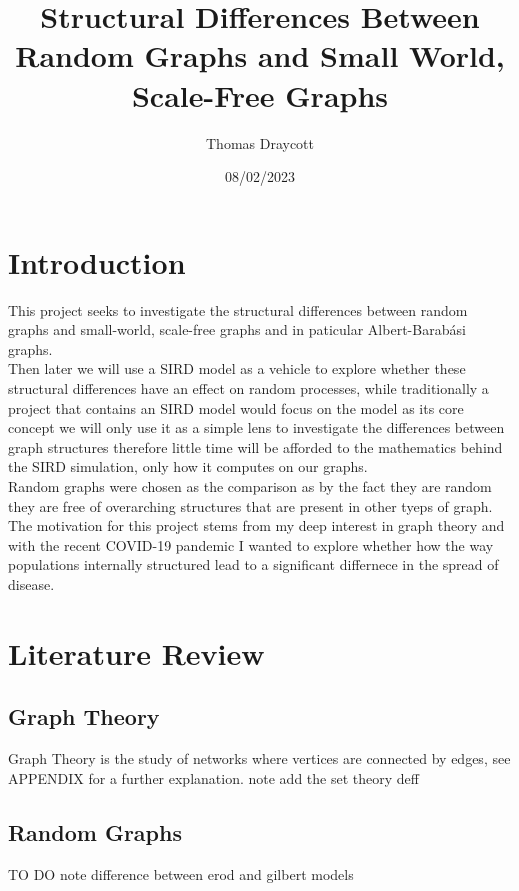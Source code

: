 \documentclass{article}
\title{Structural Differences Between Random Graphs and Small World, Scale-Free Graphs }
\date{08/02/2023}
\author{Thomas Draycott}
\begin{document}
    \maketitle
    \newpage
    \tableofcontents
    \newpage
    \section{Introduction}
    This project seeks to investigate the structural differences between random graphs and small-world, scale-free graphs and in paticular Albert-Barabási graphs.\\
    Then later we will use a SIRD model as a vehicle to explore whether these structural differences have an effect on random processes,  while traditionally a project that contains an SIRD model would focus on the model as its core concept we will only use it as a simple lens to investigate the differences between graph structures therefore little time will be afforded to the mathematics behind the SIRD simulation, only how it computes on our graphs.\\
    Random graphs were chosen as the comparison as by the fact they are random they are free of overarching structures that are present in other tyeps of graph.\\
    The motivation for this project stems from my deep interest in graph theory and with the recent COVID-19 pandemic I wanted to explore whether how the way populations internally structured lead to a significant differnece in the spread of disease.
    \section{Literature Review}
        \subsection{Graph Theory}
        Graph Theory is the study of networks where vertices are connected by edges, see APPENDIX for a further explanation. note add the set theory deff
        \subsection{Random Graphs}
        TO DO note difference between erod and gilbert models
\end{document}
